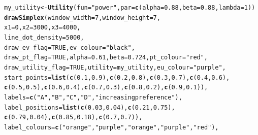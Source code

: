 \documentclass{article}\usepackage[]{graphicx}\usepackage[]{color}
\makeatletter
\newcommand{\hlnum}[1]{\textcolor[rgb]{0.686,0.059,0.569}{#1}}%
\newcommand{\hlstr}[1]{\textcolor[rgb]{0.192,0.494,0.8}{#1}}%
\newcommand{\hlstd}[1]{\textcolor[rgb]{0.345,0.345,0.345}{#1}}%
\newcommand{\hlkwb}[1]{\textcolor[rgb]{0.69,0.353,0.396}{#1}}%
\newcommand{\hlkwc}[1]{\textcolor[rgb]{0.333,0.667,0.333}{#1}}%
\newcommand{\hlkwd}[1]{\textcolor[rgb]{0.737,0.353,0.396}{\textbf{#1}}}%
\newenvironment{kframe}{%
 \def\at@end@of@kframe{}%
 \ifinner\ifhmode%
  \def\at@end@of@kframe{\end{minipage}}%
  \begin{minipage}{\columnwidth}%
 \fi\fi%
 \def\FrameCommand##1{\hskip\@totalleftmargin \hskip-\fboxsep
 \colorbox{shadecolor}{##1}\hskip-\fboxsep
     \hskip-\linewidth \hskip-\@totalleftmargin \hskip\columnwidth}%
 \MakeFramed {\advance\hsize-\width
   \@totalleftmargin\z@ \linewidth\hsize
   \@setminipage}}%
 {\par\unskip\endMakeFramed%
 \at@end@of@kframe}
\newenvironment{knitrout}{}{} %
\makeatother
\begin{document}
\begin{knitrout}
\color{fgcolor}\begin{kframe}
\begin{alltt}
\hlstd{my_utility} \hlkwb{<-} \hlkwd{Utility}\hlstd{(}\hlkwc{fun}\hlstd{=}\hlstr{"power"}\hlstd{,} \hlkwc{par}\hlstd{=}\hlkwd{c}\hlstd{(}\hlkwc{alpha}\hlstd{=}\hlnum{0.88}\hlstd{,} \hlkwc{beta}\hlstd{=}\hlnum{0.88}\hlstd{,} \hlkwc{lambda}\hlstd{=}\hlnum{1}\hlstd{))}
\hlkwd{drawSimplex}\hlstd{(}\hlkwc{window_width}\hlstd{=}\hlnum{7}\hlstd{,} \hlkwc{window_height}\hlstd{=}\hlnum{7}\hlstd{,}
        \hlkwc{x1}\hlstd{=}\hlnum{0}\hlstd{,} \hlkwc{x2}\hlstd{=}\hlnum{3000}\hlstd{,} \hlkwc{x3}\hlstd{=}\hlnum{4000}\hlstd{,}
        \hlkwc{line_dot_density}\hlstd{=}\hlnum{5000}\hlstd{,}
        \hlkwc{draw_ev_flag}\hlstd{=}\hlnum{TRUE}\hlstd{,} \hlkwc{ev_colour}\hlstd{=}\hlstr{"black"}\hlstd{,}
        \hlkwc{draw_pt_flag}\hlstd{=}\hlnum{TRUE}\hlstd{,} \hlkwc{alpha}\hlstd{=}\hlnum{0.61}\hlstd{,} \hlkwc{beta}\hlstd{=}\hlnum{0.724}\hlstd{,} \hlkwc{pt_colour}\hlstd{=}\hlstr{"red"}\hlstd{,}
        \hlkwc{draw_utility_flag}\hlstd{=}\hlnum{TRUE}\hlstd{,} \hlkwc{utility}\hlstd{=my_utility,} \hlkwc{eu_colour}\hlstd{=}\hlstr{"purple"}\hlstd{,}
        \hlkwc{start_points}\hlstd{=}\hlkwd{list}\hlstd{(}\hlkwd{c}\hlstd{(}\hlnum{0.1}\hlstd{,}\hlnum{0.9}\hlstd{),}\hlkwd{c}\hlstd{(}\hlnum{0.2}\hlstd{,}\hlnum{0.8}\hlstd{),}\hlkwd{c}\hlstd{(}\hlnum{0.3}\hlstd{,}\hlnum{0.7}\hlstd{),}\hlkwd{c}\hlstd{(}\hlnum{0.4}\hlstd{,}\hlnum{0.6}\hlstd{),}
                \hlkwd{c}\hlstd{(}\hlnum{0.5}\hlstd{,}\hlnum{0.5}\hlstd{),}\hlkwd{c}\hlstd{(}\hlnum{0.6}\hlstd{,}\hlnum{0.4}\hlstd{),}\hlkwd{c}\hlstd{(}\hlnum{0.7}\hlstd{,}\hlnum{0.3}\hlstd{),}\hlkwd{c}\hlstd{(}\hlnum{0.8}\hlstd{,}\hlnum{0.2}\hlstd{),}\hlkwd{c}\hlstd{(}\hlnum{0.9}\hlstd{,}\hlnum{0.1}\hlstd{)),}
                        \hlkwc{labels}\hlstd{=}\hlkwd{c}\hlstd{(}\hlstr{"A"}\hlstd{,}\hlstr{"B"}\hlstd{,}\hlstr{"C"}\hlstd{,}\hlstr{"D"}\hlstd{,}\hlstr{"increasing preference"}\hlstd{),}
                \hlkwc{label_positions}\hlstd{=}\hlkwd{list}\hlstd{(}\hlkwd{c}\hlstd{(}\hlnum{0.03}\hlstd{,}\hlnum{0.04}\hlstd{),}\hlkwd{c}\hlstd{(}\hlnum{0.21}\hlstd{,}\hlnum{0.75}\hlstd{),}
                        \hlkwd{c}\hlstd{(}\hlnum{0.79}\hlstd{,}\hlnum{0.04}\hlstd{),}\hlkwd{c}\hlstd{(}\hlnum{0.85}\hlstd{,}\hlnum{0.18}\hlstd{),}\hlkwd{c}\hlstd{(}\hlnum{0.7}\hlstd{,}\hlnum{0.7}\hlstd{)),}
                \hlkwc{label_colours}\hlstd{=}\hlkwd{c}\hlstd{(}\hlstr{"orange"}\hlstd{,}\hlstr{"purple"}\hlstd{,}\hlstr{"orange"}\hlstd{,}\hlstr{"purple"}\hlstd{,}\hlstr{"red"}\hlstd{),}

\end{alltt}
\end{kframe}
\end{knitrout}
\end{document}
